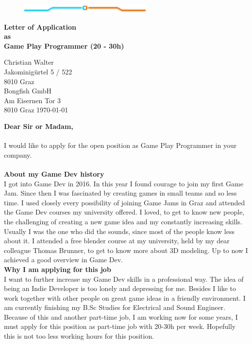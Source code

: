 \documentclass{article}
\newcommand{\myTitle}[1]{{\fontfamily{ffm}\selectfont \textbf{\Huge{#1}} }}
\newcommand{\mySubTitle}[1]{{\fontfamily{ffm}\selectfont \textbf{\large{#1}} }}
\newcommand{\headParam}[1]{{\normalfont \selectfont \textbf{\large{#1}} }}
\begin{document}
\begin{center}
\begin{figure}[h]
    \centering
    \includegraphics[width=0.6\textwidth]{../../lib/figs/tron_blue_orange_up}
\end{figure}
\myTitle{Letter of Application} \\
\mySubTitle{as \\ Game Play Programmer (20 - 30h)}

\end{center}

\vspace{0.5cm}
Christian Walter \\
Jakominigürtel 5 / 522 \\
8010 Graz \\

\vspace{0.1cm}
Bongfish GmbH \\
Am Eisernen Tor 3 \\
8010 Graz \hfill
\today


\vspace{0.25cm}
\mySubTitle{Dear Sir or Madam,}
\\ \\
I would like to apply for the open position as Game Play Programmer in your company.\\\\
\headParam{About my Game Dev history}
\\
I got into Game Dev in 2016. In this year I found courage to join my first Game Jam. Since then I was fascinated by creating games in small teams and so less time. I used closely every possibility of joining Game Jams in Graz and attended the Game Dev courses my university offered. I loved, to get to know new people, the challenging of creating a new game idea and my constantly increasing skills. Usually I was the one who did the sounds, since most of the people know less about it. I attended a free blender course at my university, held by my dear colleague Thomas Brunner, to get to know more about 3D modeling. Up to now I achieved a good overview in Game Dev.\\

\headParam{Why I am applying for this job}
\\
I want to further increase my Game Dev skills in a professional way. The idea of being an Indie Developer is too lonely and depressing for me. Besides I like to work together with other people on great game ideas in a friendly environment. I am currently finishing my B.Sc Studies for Electrical and Sound Engineer. Because of this and another part-time job, I am working now for some years, I must apply for this position as part-time job with 20-30h per week. Hopefully this is not too less working hours for this position. \\
\end{document}
